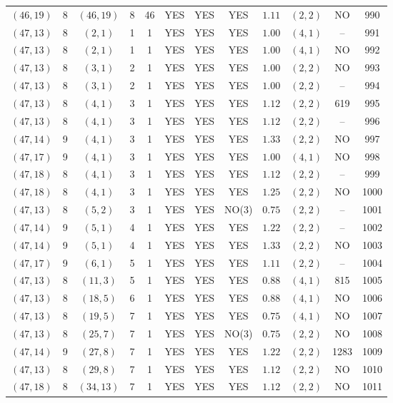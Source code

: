 \begin{longtable}{|c|c|c|c|c|c|c|c|c|c|c|c|}
$(46,19)$ & 8 & $(46,19)$ & 8 & 46 & YES & YES & YES & $1.11$ & $(2,2)$ & NO & 990\\
$(47,13)$ & 8 & $(2,1)$ & 1 & 1 & YES & YES & YES & $1.00$ & $(4,1)$ & -- & 991\\
$(47,13)$ & 8 & $(2,1)$ & 1 & 1 & YES & YES & YES & $1.00$ & $(4,1)$ & NO & 992\\
$(47,13)$ & 8 & $(3,1)$ & 2 & 1 & YES & YES & YES & $1.00$ & $(2,2)$ & NO & 993\\
$(47,13)$ & 8 & $(3,1)$ & 2 & 1 & YES & YES & YES & $1.00$ & $(2,2)$ & -- & 994\\
$(47,13)$ & 8 & $(4,1)$ & 3 & 1 & YES & YES & YES & $1.12$ & $(2,2)$ & 619 & 995\\
$(47,13)$ & 8 & $(4,1)$ & 3 & 1 & YES & YES & YES & $1.12$ & $(2,2)$ & -- & 996\\
$(47,14)$ & 9 & $(4,1)$ & 3 & 1 & YES & YES & YES & $1.33$ & $(2,2)$ & NO & 997\\
$(47,17)$ & 9 & $(4,1)$ & 3 & 1 & YES & YES & YES & $1.00$ & $(4,1)$ & NO & 998\\
$(47,18)$ & 8 & $(4,1)$ & 3 & 1 & YES & YES & YES & $1.12$ & $(2,2)$ & -- & 999\\
$(47,18)$ & 8 & $(4,1)$ & 3 & 1 & YES & YES & YES & $1.25$ & $(2,2)$ & NO & 1000\\
$(47,13)$ & 8 & $(5,2)$ & 3 & 1 & YES & YES & NO(3) & $0.75$ & $(2,2)$ & -- & 1001\\
$(47,14)$ & 9 & $(5,1)$ & 4 & 1 & YES & YES & YES & $1.22$ & $(2,2)$ & -- & 1002\\
$(47,14)$ & 9 & $(5,1)$ & 4 & 1 & YES & YES & YES & $1.33$ & $(2,2)$ & NO & 1003\\
$(47,17)$ & 9 & $(6,1)$ & 5 & 1 & YES & YES & YES & $1.11$ & $(2,2)$ & -- & 1004\\
$(47,13)$ & 8 & $(11,3)$ & 5 & 1 & YES & YES & YES & $0.88$ & $(4,1)$ & 815 & 1005\\
$(47,13)$ & 8 & $(18,5)$ & 6 & 1 & YES & YES & YES & $0.88$ & $(4,1)$ & NO & 1006\\
$(47,13)$ & 8 & $(19,5)$ & 7 & 1 & YES & YES & YES & $0.75$ & $(4,1)$ & NO & 1007\\
$(47,13)$ & 8 & $(25,7)$ & 7 & 1 & YES & YES & NO(3) & $0.75$ & $(2,2)$ & NO & 1008\\
$(47,14)$ & 9 & $(27,8)$ & 7 & 1 & YES & YES & YES & $1.22$ & $(2,2)$ & 1283 & 1009\\
$(47,13)$ & 8 & $(29,8)$ & 7 & 1 & YES & YES & YES & $1.12$ & $(2,2)$ & NO & 1010\\
$(47,18)$ & 8 & $(34,13)$ & 7 & 1 & YES & YES & YES & $1.12$ & $(2,2)$ & NO & 1011\\

\end{longtable}
